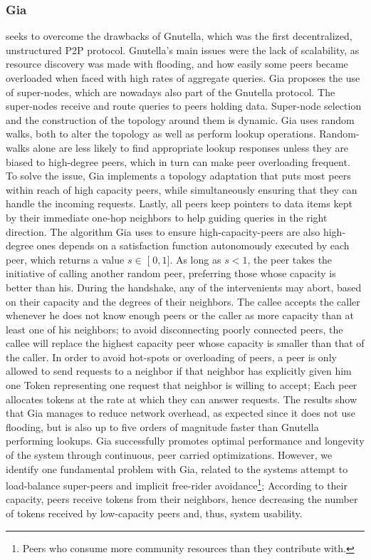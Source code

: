 \documentclass[runningheads]{llncs}
\begin{document}
\subsubsection{Gia} \cite{gia} seeks to overcome the drawbacks of Gnutella\cite{gnutella-rfc}, which was the first decentralized, unstructured P2P protocol. Gnutella's main issues were the lack of scalability, as resource discovery was made with flooding, and how easily some peers became overloaded when faced with high rates of aggregate queries. Gia proposes the use of super-nodes, which are nowadays also part of the Gnutella protocol. The super-nodes receive and route queries to peers holding data. Super-node selection and the construction of the topology around them is dynamic. Gia uses random walks, both to alter the topology as well as perform lookup operations. Random-walks alone are less likely to find appropriate lookup responses unless they are biased to high-degree peers, which in turn can make peer overloading frequent. To solve the issue, Gia implements a topology adaptation that puts most peers within reach of high capacity peers, while simultaneously ensuring that they can handle the incoming requests. Lastly, all peers keep pointers to data items kept by their immediate one-hop neighbors to help guiding queries in the right direction. The algorithm Gia uses to ensure high-capacity-peers are also high-degree ones depends on a satisfaction function autonomously executed by each peer, which returns a value $s\in\mathclose[0,1\mathclose]$. As long as $s<1$, the peer takes the initiative of calling another random peer, preferring those whose capacity is better than his. During the handshake, any of the intervenients may abort, based on their capacity and the degrees of their neighbors. The callee accepts the caller whenever he does not know enough peers or the caller as more capacity than at least one of his neighbors; to avoid disconnecting poorly connected peers, the callee will replace the highest capacity peer whose capacity is smaller than that of the caller. In order to avoid hot-spots or overloading of peers, a peer is only allowed to send requests to a neighbor if that neighbor has explicitly given him one Token representing one request that neighbor is willing to accept; Each peer allocates tokens at the rate at which they can answer requests. The results show that Gia manages to reduce network overhead, as expected since it does not use flooding, but is also up to five orders of magnitude faster than Gnutella performing lookups. Gia successfully promotes optimal performance and longevity of the system through continuous, peer carried optimizations. However, we identify one fundamental problem with Gia, related to the systems attempt to load-balance super-peers and implicit free-rider avoidance\footnote{Peers who consume more community resources than they contribute with.}; According to their capacity, peers receive tokens from their neighbors, hence decreasing the number of tokens received by low-capacity peers and, thus, system usability.
\end{document}
